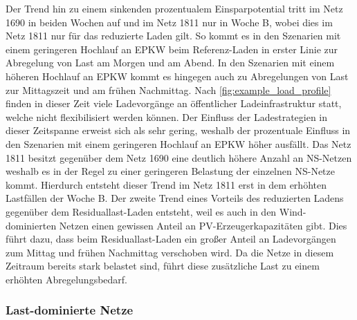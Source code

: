 

Der Trend hin zu einem sinkenden prozentualem Einsparpotential tritt im Netz \num{1690} in beiden Wochen auf und im Netz \num{1811} nur in Woche B, wobei dies im Netz \num{1811} nur für das reduzierte Laden gilt.
So kommt es in den Szenarien mit einem geringeren Hochlauf an \gls{EPKW} beim Referenz-Laden in erster Linie zur Abregelung von Last am Morgen und am Abend.
In den Szenarien mit einem höheren Hochlauf an \gls{EPKW} kommt es hingegen auch zu Abregelungen von Last zur Mittagszeit und am frühen Nachmittag.
Nach \autoref{fig:example_load_profile} finden in dieser Zeit viele Ladevorgänge an öffentlicher Ladeinfrastruktur statt, welche nicht flexibilisiert werden können.
Der Einfluss der Ladestrategien in dieser Zeitspanne erweist sich als sehr gering, weshalb der prozentuale Einfluss in den Szenarien mit einem geringeren Hochlauf an \gls{EPKW} höher ausfällt.
Das Netz \num{1811} besitzt gegenüber dem Netz \num{1690} eine deutlich höhere Anzahl an \gls{NS}-Netzen weshalb es in der Regel zu einer geringeren Belastung der einzelnen \gls{NS}-Netze kommt.
Hierdurch entsteht dieser Trend im Netz \num{1811} erst in dem erhöhten Lastfällen der Woche B.
Der zweite Trend eines Vorteils des reduzierten Ladens gegenüber dem Residuallast-Laden entsteht, weil es auch in den Wind-dominierten Netzen einen gewissen Anteil an \gls{PV}-Erzeugerkapazitäten gibt.
Dies führt dazu, dass beim Residuallast-Laden ein großer Anteil an Ladevorgängen zum Mittag und frühen Nachmittag verschoben wird.
Da die Netze in diesem Zeitraum bereits stark belastet sind, führt diese zusätzliche Last zu einem erhöhten Abregelungsbedarf.





\subsubsection{Last-dominierte Netze}



\clearpage

